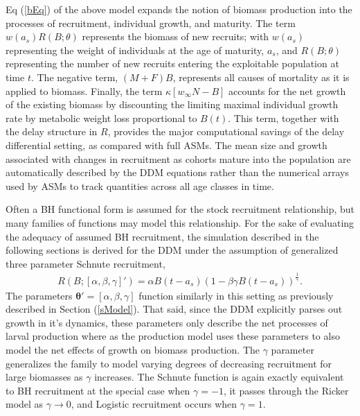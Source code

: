 %
Eq (\ref{bEq}) of the above model expands the notion of biomass production into the
processes of recruitment, individual growth, and maturity. The term $w(a_s)R(B;\theta)$
represents the biomass of new recruits; with $w(a_s)$ representing the weight of individuals
at the age of maturity, $a_s$, and $R(B;\theta)$ representing the number of new recruits
entering the exploitable population at time $t$. The negative term, $(M+F)B$, represents all
causes of mortality as it is applied to biomass. Finally, the term $\kappa \left[w_\infty N-B\right]$
accounts for the net growth of the existing biomass by discounting the limiting maximal individual
growth rate by metabolic weight loss proportional to $B(t)$. This term, together with the delay
structure in $R$, provides the major computational savings of the delay differential setting, as
compared with full ASMs. The mean size and growth associated with changes in recruitment as cohorts 
mature into the population are automatically described by the DDM equations rather than the 
numerical arrays used by ASMs to track quantities across all age classes in time.

%
Often a BH functional form is assumed for the stock recruitment relationship, but many %
families of functions may model this relationship. For the sake of evaluating the adequacy
of assumed BH recruitment, the simulation described in the following sections is derived for the 
DDM under the assumption of generalized three parameter Schnute recruitment,
%
\begin{align}
R(B;[\alpha, \beta, \gamma]') = \alpha B(t-a_s)(1-\beta\gamma B(t-a_s))^{\frac{1}{\gamma}}. \label{srr}
\end{align}
%
The parameters $\bm{\theta}'=[\alpha, \beta, \gamma]$ %
function similarly in this setting as previously described in Section (\ref{sModel}).
That said, since the DDM explicitly parses out growth in it's dynamics,
these parameters only describe the net processes of larval production %
where as the production model uses these parameters to also model the net 
effects of growth on biomass production. %
The $\gamma$ parameter generalizes the family to model varying degrees of
decreasing recruitment for large biomasses as $\gamma$ increases. The Schnute
function is again exactly equivalent to BH recruitment at the special case when
$\gamma=-1$, it passes through the Ricker model as $\gamma\rightarrow0$, and
Logistic recruitment occurs when $\gamma=1$.

